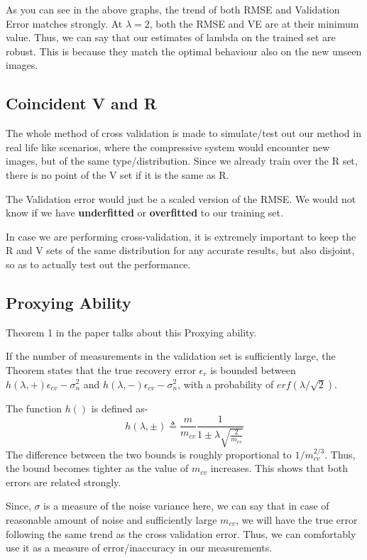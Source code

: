 \documentclass[a4paper,14pt]{article}
\numberwithin{definition}{section}
\numberwithin{mytheorem}{subsection}
\begin{document}
As you can see in the above graphs, the trend of both RMSE and Validation Error matches strongly. At $\lambda=2$, both the RMSE and VE are at their minimum value. Thus, we can say that our estimates of lambda on the trained set are robust. This is because they match the optimal behaviour also on the new unseen images.

\subsection{Coincident V and R}

The whole method of cross validation is made to simulate/test out our method in real life like scenarios, where the compressive system would encounter new images, but of the same type/distribution. Since we already train over the R set, there is no point of the V set if it is the same as R.

The Validation error would just be a scaled version of the RMSE. We would not know if we have \textbf{underfitted} or \textbf{overfitted} to our training set.

In case we are performing cross-validation, it is extremely important to keep the R and V sets of the same distribution for any accurate results, but also disjoint, so as to actually test out the performance.

\subsection{Proxying Ability}

Theorem 1 in the paper talks about this Proxying ability.

If the number of measurements in the validation set is sufficiently large, the Theorem states that the true recovery error $\epsilon_r$ is bounded between $h(\lambda,+)\epsilon_{cv}-\sigma_n^2$ and $h(\lambda,-)\epsilon_{cv}-\sigma_n^2$, with a probability of $erf(\lambda/\sqrt{2})$.

The function $h()$ is defined as-
$$ h(\lambda, \pm) \triangleq \frac{m}{m_{cv}}\frac{1}{1\pm \lambda \sqrt{\frac{2}{m_{cv}}}} $$
The difference between the two bounds is roughly proportional to $1/m_{cv}^{2/3}$. Thus, the bound becomes tighter as the value of $m_{cv}$ increases. This shows that both errors are related strongly.

Since, $\sigma$ is a measure of the noise variance here, we can say that in case of reasonable amount of noise and sufficiently large $m_{cv}$, we will have the true error following the same trend as the cross validation error. Thus, we can comfortably use it as a measure of error/inaccuracy in our measurements.
\end{document}
